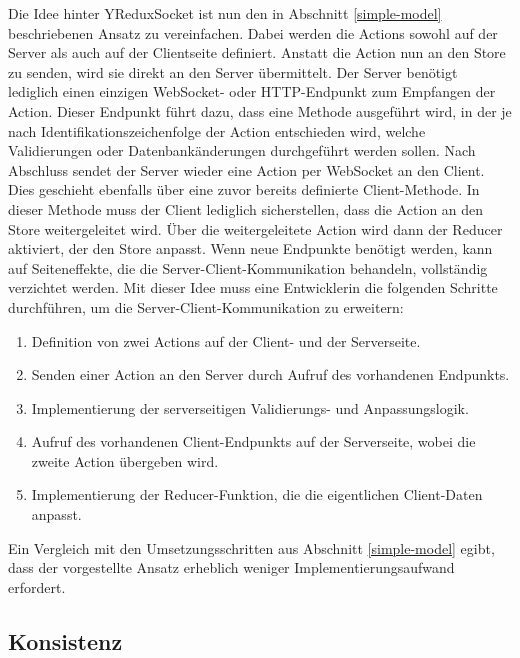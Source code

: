\documentclass[12pt]{article} %
\begin{document}
Die Idee hinter YReduxSocket ist nun den in Abschnitt \ref{simple-model} beschriebenen Ansatz zu vereinfachen. Dabei werden die Actions sowohl auf der Server als auch auf der Clientseite definiert. Anstatt die Action nun an den Store zu senden, wird sie direkt an den Server übermittelt. Der Server benötigt lediglich einen einzigen WebSocket- oder HTTP-Endpunkt zum Empfangen der Action. Dieser Endpunkt führt dazu, dass eine Methode ausgeführt wird, in der je nach Identifikationszeichenfolge der Action entschieden wird, welche Validierungen oder Datenbankänderungen durchgeführt werden sollen. Nach Abschluss sendet der Server wieder eine Action per WebSocket an den Client. Dies geschieht ebenfalls über eine zuvor bereits definierte Client-Methode. In dieser Methode muss der Client lediglich sicherstellen, dass die Action an den Store weitergeleitet wird. Über die weitergeleitete Action wird dann der Reducer aktiviert, der den Store anpasst. Wenn neue Endpunkte benötigt werden, kann auf Seiteneffekte, die die Server-Client-Kommunikation behandeln, vollständig verzichtet werden. Mit dieser Idee muss eine Entwicklerin die folgenden Schritte durchführen, um die Server-Client-Kommunikation zu erweitern:
\begin{enumerate}
    \item Definition von zwei Actions auf der Client- und der Serverseite.
    \item Senden einer Action an den Server durch Aufruf des vorhandenen Endpunkts.
    \item Implementierung der serverseitigen Validierungs- und Anpassungslogik.
    \item Aufruf des vorhandenen Client-Endpunkts auf der Serverseite, wobei die zweite Action übergeben wird.
    \item Implementierung der Reducer-Funktion, die die eigentlichen Client-Daten anpasst.
\end{enumerate}

Ein Vergleich mit den Umsetzungsschritten aus Abschnitt \ref{simple-model} egibt, dass der vorgestellte Ansatz erheblich weniger Implementierungsaufwand erfordert.

\subsection{Konsistenz}
\end{document}
